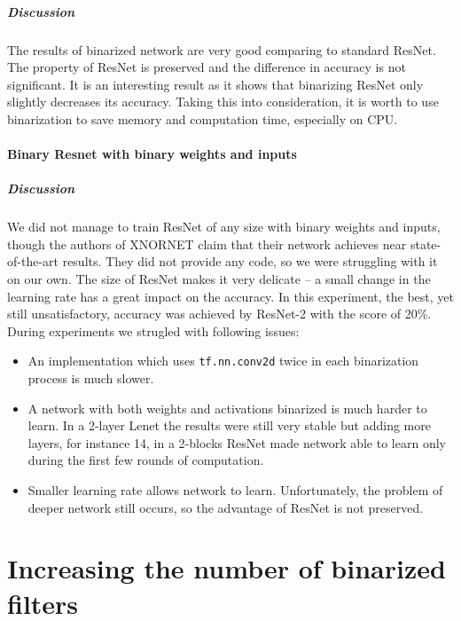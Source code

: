 \documentclass[licencjacka]{pracamgr}
\begin{document}
		        \paragraph{Discussion} 

		        The results of binarized network are very good comparing to standard ResNet. The property of ResNet is preserved and the difference in accuracy is not significant. It is an interesting result as it shows that binarizing ResNet only slightly decreases its accuracy. Taking this into consideration, it is worth to use binarization to save memory and computation time, especially on CPU.

			\subsubsection{Binary Resnet with binary weights and inputs}
			        \paragraph{Discussion} 
				We did not manage to train ResNet of any size with binary weights and inputs, though the authors of XNORNET claim that their network achieves near state-of-the-art results. They did not provide any code, so we were struggling with it on our own. The size of ResNet makes it very delicate -- a small change in the learning rate has a great impact on the accuracy. In this experiment, the best, yet still unsatisfactory, accuracy was achieved by ResNet-2 with the score of 20\%. 
				During experiments we strugled with following issues:
			        \begin{itemize}
			                \item An implementation which uses \texttt{tf.nn.conv2d} twice in each binarization process is much slower. 
			                \item A network with both weights and activations binarized is much harder to learn. In a 2-layer Lenet the results were still very stable but adding more layers, for instance 14, in a 2-blocks ResNet made network able to learn only during the first few rounds of computation.
			                \item Smaller learning rate allows network to learn. Unfortunately, the problem of deeper network still occurs, so the advantage of ResNet is not preserved.
			        \end{itemize}
\chapter{Increasing the number of binarized filters}
\end{document}
